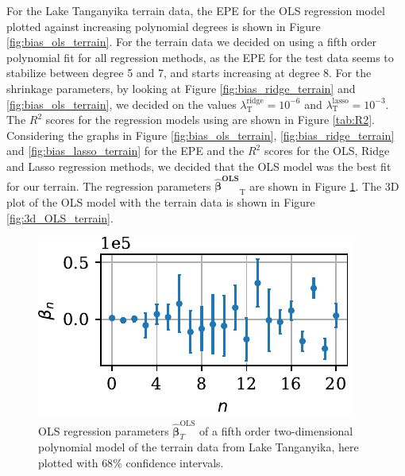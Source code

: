 \documentclass[a4paper, 10pt]{article}
\begin{document}
\begin{multicols}{2}
\noindent
For the Lake Tanganyika  terrain data, the EPE for the OLS regression model plotted against increasing polynomial degrees is shown in Figure \ref{fig:bias_ols_terrain}. For the terrain data we decided on using a fifth order polynomial fit for all regression methods, as the EPE for the test data seems to stabilize between degree 5 and 7, and starts increasing at degree 8.  For the shrinkage parameters, by looking at Figure \ref{fig:bias_ridge_terrain} and \ref{fig:bias_ols_terrain}, we decided on the values  $\lambda^\text{ridge}_\text{T}=10^{-6} $ and $\lambda^\text{lasso}_\text{T}=10^{-3} $. 
The $R^2$ scores for the regression models using are shown in Figure \ref{tab:R2}. Considering the graphs in Figure \ref{fig:bias_ols_terrain}, \ref{fig:bias_ridge_terrain} and \ref{fig:bias_lasso_terrain} for the EPE  and the $R^2$ scores for the OLS, Ridge and Lasso regression methods, we decided that the OLS model was the best fit for our terrain.  The regression parameters $\bm{\hat{\beta}^\text{OLS}}_\text{T}$ are shown in Figure \ref{fig:beta_variance_terrain}. The 3D plot of the OLS model with the terrain data is shown in Figure \ref{fig:3d_OLS_terrain}.

\begin{figure}[H]
    \includegraphics[scale=1]{figs/beta_variance_ols_terrain.pdf}
    \caption{OLS regression parameters $\bm{\hat{\beta}}^{\text{OLS}}_T$  of a fifth order two-dimensional polynomial model  of the terrain data from Lake Tanganyika, here plotted with $68\%$ confidence intervals.}
    \label{fig:beta_variance_terrain}
\end{figure}

\end{multicols}
\end{document}
